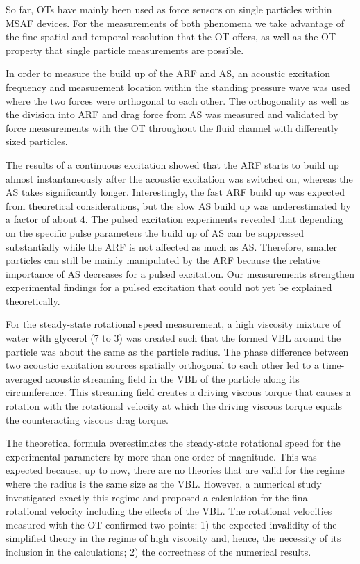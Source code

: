 So far, OTs have mainly been used as force sensors on single particles within 
MSAF devices. For the measurements of both phenomena we take advantage of the 
fine spatial and temporal resolution that the OT offers, as well as the OT 
property that single particle measurements are possible.

In order to measure the build up of the ARF and AS, an acoustic excitation 
frequency and measurement location within the standing pressure wave was used 
where the two forces were orthogonal to each other. The orthogonality as well 
as the division into ARF and drag force from AS was measured and validated by 
force measurements with the OT throughout the fluid channel with differently 
sized particles.

The results of a continuous excitation showed that the ARF starts to build up 
almost instantaneously after the acoustic excitation was switched on, whereas 
the AS takes significantly longer. Interestingly, the fast ARF build up was 
expected from theoretical considerations, but the slow AS build up was 
underestimated by a factor of about 4. The pulsed excitation experiments 
revealed that depending on the specific pulse parameters the build up of AS can 
be suppressed substantially while the ARF is not affected as much as AS. 
Therefore, smaller particles can still be mainly manipulated by the ARF because 
the relative importance of AS decreases for a pulsed excitation. Our 
measurements strengthen experimental findings for a pulsed excitation that 
could not yet be explained theoretically.


For the steady-state rotational speed measurement, a high viscosity mixture of 
water with glycerol (7 to 3) was created such that the formed VBL around the 
particle was about the same as the particle radius. The phase difference 
between two acoustic excitation sources spatially orthogonal to each other led 
to a time-averaged acoustic streaming field in the VBL of the particle along 
its circumference. This streaming field creates a driving viscous torque that 
causes a rotation with the rotational velocity at which the driving viscous 
torque equals the counteracting viscous drag torque.

The theoretical formula overestimates the steady-state rotational speed for the 
experimental parameters by more than one order of magnitude. This was expected 
because, up to now, there are no theories that are valid for the regime where 
the radius is the same size as the VBL. However, a numerical study investigated 
exactly this regime and proposed a calculation for the final rotational 
velocity including the effects of the VBL. The rotational velocities measured 
with the OT confirmed two points: 1) the expected invalidity of the simplified 
theory in the regime of high viscosity and, hence, the necessity of its 
inclusion in the calculations; 2) the correctness of the numerical results.

